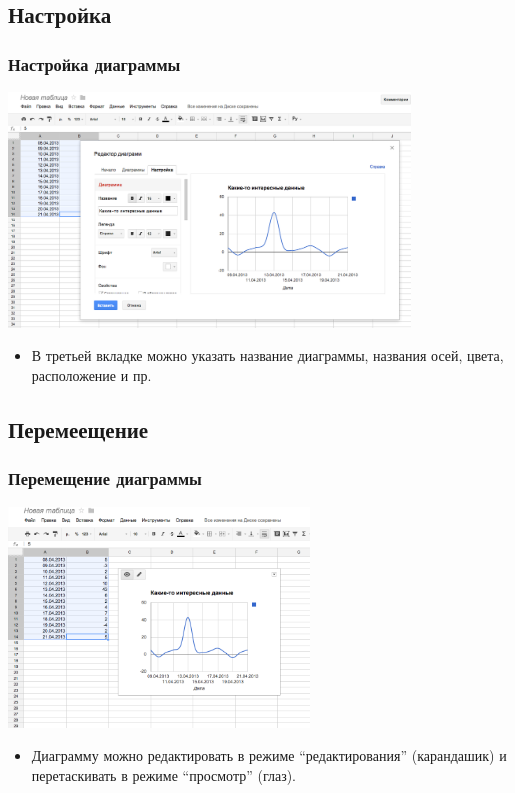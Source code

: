 \documentclass[compress,red]{beamer}
\begin{document}
\subsection{Настройка}
\begin{frame}[fragile]
  \frametitle{Настройка диаграммы}
  \centerline{\includegraphics[width=0.8\textwidth]{images/04.png}}
  \begin{itemize}
      \item В третьей вкладке можно указать название диаграммы, названия осей, цвета, расположение и пр.
  \end{itemize}
\end{frame}

\subsection{Перемеещение}
\begin{frame}[fragile]
  \frametitle{Перемещение диаграммы}
  \centerline{\includegraphics[width=0.6\textwidth]{images/05.png}}
  \begin{itemize}
      \item Диаграмму можно редактировать в режиме ``редактирования'' (карандашик) и перетаскивать в режиме ``просмотр'' (глаз).
  \end{itemize}
\end{frame}
\end{document}
